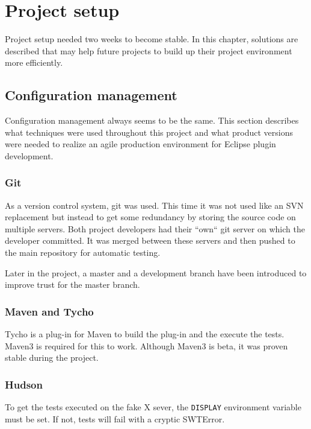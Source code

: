 \chapter{Project setup}
\thispagestyle{fancy}

Project setup needed two weeks to become stable. In this chapter, solutions are 
described that may help future projects to build up their project environment 
more efficiently.

\section{Configuration management}

Configuration management always seems to be the same. This section describes 
what techniques were used throughout this project and what product versions were 
needed to realize an agile production environment for Eclipse plugin development.

\subsection{Git}

As a version control system, git was used. This time it was not used like an SVN
replacement but instead to get some redundancy by storing the source code on
multiple servers. Both project developers had their ``own`` git server on which
the developer committed. It was merged between these servers and then pushed to
the main repository for automatic testing.

Later in the project, a master and a development branch have been introduced to 
improve trust for the master branch.

\subsection{Maven and Tycho}

Tycho is a plug-in for Maven to build the plug-in and the execute the tests.
Maven3 is required for this to work. Although Maven3 is beta, it was proven
stable during the project.

\subsection{Hudson}

To get the tests executed on the fake X sever, the \texttt{DISPLAY} environment
variable must be set. If not, tests will fail with a cryptic
SWTError.

